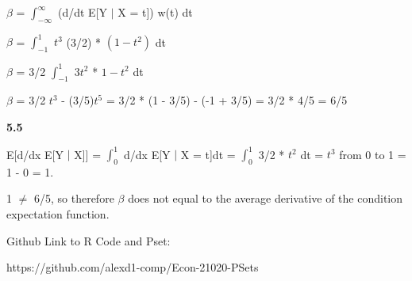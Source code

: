 $\beta$ = $\int_{-\infty}^{\infty}$ (d/dt E[Y $\mid$ X = t]) w(t) dt

$\beta$ = $\int_{-1}^{1}$ $t^{3}$ (3/2) * $(1 - t^{2})$ dt

$\beta$ = 3/2 $\int_{-1}^{1}$ $3t^{2}$ * $1 - t^{2}$ dt

$\beta$ = 3/2 $t^{3}$ - (3/5)$t^{5}$ = 3/2 * (1 - 3/5) - (-1 + 3/5) = 3/2 * 4/5 = 6/5

\textbf{5.5}

E[d/dx E[Y $\mid$ X]] = $\int_{0}^{1}$ d/dx E[Y $\mid$ X = t]dt =  $\int_{0}^{1}$ 3/2 * $t^2$ dt = $t^{3}$ from 0 to 1 = 1 - 0 = 1.

1 $\neq$ 6/5, so therefore $\beta$ does not equal to the average derivative of the condition expectation function.

\newpage

Github Link to R Code and Pset:

https://github.com/alexd1-comp/Econ-21020-PSets

